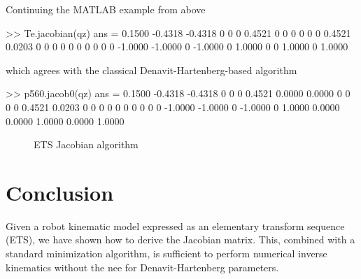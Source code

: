 \documentclass[11pt]{article}
\begin{document}
Continuing the MATLAB example from above
\begin{Code}
>> Te.jacobian(qz)
ans =
    0.1500   -0.4318   -0.4318         0         0         0
    0.4521         0         0         0         0         0
         0    0.4521    0.0203         0         0         0
         0         0         0         0         0         0
         0   -1.0000   -1.0000         0   -1.0000         0
    1.0000         0         0    1.0000         0    1.0000
\end{Code}
which agrees with the classical Denavit-Hartenberg-based algorithm\cite{Paul81c}
\begin{Code}
>> p560.jacob0(qz)
ans =
    0.1500   -0.4318   -0.4318         0         0         0
    0.4521    0.0000    0.0000         0         0         0
         0    0.4521    0.0203         0         0         0
         0         0         0         0         0         0
         0   -1.0000   -1.0000         0   -1.0000         0
    1.0000    0.0000    0.0000    1.0000    0.0000    1.0000
\end{Code}    


\begin{figure}
\begin{center}
\begin{algorithmic}
\EndFor
\end{algorithmic}
\end{center}
\caption{ETS Jacobian algorithm}\label{fig:algo}
\end{figure}


\section{Conclusion}
Given a robot kinematic model expressed as an elementary transform sequence (ETS), we have shown how to derive the Jacobian
matrix.  This, combined with a standard minimization algorithm, is sufficient to perform numerical inverse kinematics without the nee
for Denavit-Hartenberg parameters.



\end{document}
